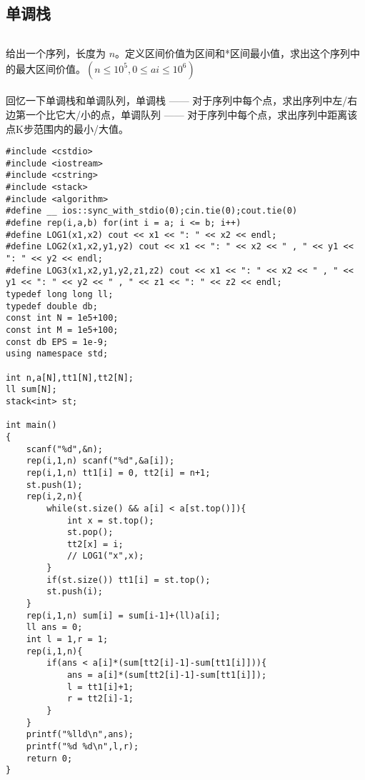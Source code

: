 \documentclass[twoside]{article}
\begin{document}
\subsection{单调栈}
\begin{lstlisting}
\end{lstlisting}
给出一个序列，长度为 $n$。定义区间价值为区间和*区间最小值，求出这个序列中的最大区间价值。$(n\leq 10^5,0\leq ai\leq 10^6)$\\
\\
回忆一下单调栈和单调队列，单调栈 —— 对于序列中每个点，求出序列中左/右边第一个比它大/小的点，单调队列 —— 对于序列中每个点，求出序列中距离该点K步范围内的最小/大值。\\
\begin{lstlisting}
#include <cstdio>
#include <iostream>
#include <cstring>
#include <stack>
#include <algorithm>
#define __ ios::sync_with_stdio(0);cin.tie(0);cout.tie(0)
#define rep(i,a,b) for(int i = a; i <= b; i++)
#define LOG1(x1,x2) cout << x1 << ": " << x2 << endl;
#define LOG2(x1,x2,y1,y2) cout << x1 << ": " << x2 << " , " << y1 << ": " << y2 << endl;
#define LOG3(x1,x2,y1,y2,z1,z2) cout << x1 << ": " << x2 << " , " << y1 << ": " << y2 << " , " << z1 << ": " << z2 << endl;
typedef long long ll;
typedef double db;
const int N = 1e5+100;
const int M = 1e5+100;
const db EPS = 1e-9;
using namespace std;

int n,a[N],tt1[N],tt2[N];
ll sum[N];
stack<int> st;

int main()
{
	scanf("%d",&n);
	rep(i,1,n) scanf("%d",&a[i]);
	rep(i,1,n) tt1[i] = 0, tt2[i] = n+1;
	st.push(1);
	rep(i,2,n){
		while(st.size() && a[i] < a[st.top()]){
			int x = st.top();
			st.pop();
			tt2[x] = i;
			// LOG1("x",x);
		}
		if(st.size()) tt1[i] = st.top();
		st.push(i);
	}
	rep(i,1,n) sum[i] = sum[i-1]+(ll)a[i];
	ll ans = 0;
	int l = 1,r = 1;
	rep(i,1,n){
		if(ans < a[i]*(sum[tt2[i]-1]-sum[tt1[i]])){
			ans = a[i]*(sum[tt2[i]-1]-sum[tt1[i]]);
			l = tt1[i]+1;
			r = tt2[i]-1;
		}
	}
	printf("%lld\n",ans);
	printf("%d %d\n",l,r);
	return 0;
}
\end{lstlisting}
\end{document}
